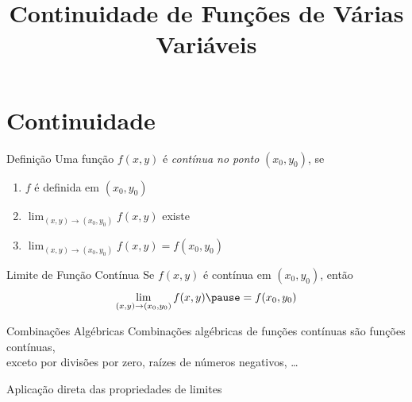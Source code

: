 
\usepackage{calculo_varias_variaveis-1}

\title{Continuidade de Funções de Várias Variáveis}



\addtitle

\section{Continuidade}

\begin{frame}{Definição}
  Uma função \(f(x, y)\) é \emph{contínua no ponto} $(x_0, y_0)$, se

  \vspace{0.5\baselineskip}
  \begin{enumerate}[<+->]
    \setlength\itemsep{1.5em}
    \item $f$ é definida em \((x_0, y_0)\)
    \item \(\lim_{(x, y)\to(x_0, y_0)} f(x, y)\) existe
    \item \(\lim_{(x, y)\to(x_0, y_0)} f(x, y) = f(x_0, y_0)\)
  \end{enumerate}

  \vspace{\baselineskip}
\end{frame}

\begin{frame}{Limite de Função Contínua}
  Se \(f(x, y)\) é contínua em $(x_0, y_0)$,
  \pause
  então
  \[
    \lim_{(x, y)\to(x_0, y_0)} f(x, y) \pause = f(x_0, y_0)
  \]
\end{frame}

\begin{frame}{Combinações Algébricas}
  Combinações algébricas de funções contínuas são funções contínuas, \\
  exceto por divisões por zero, raízes de números negativos, \dots

  \pause
  \vspace{\baselineskip}
  Aplicação direta das propriedades de limites
\end{frame}


